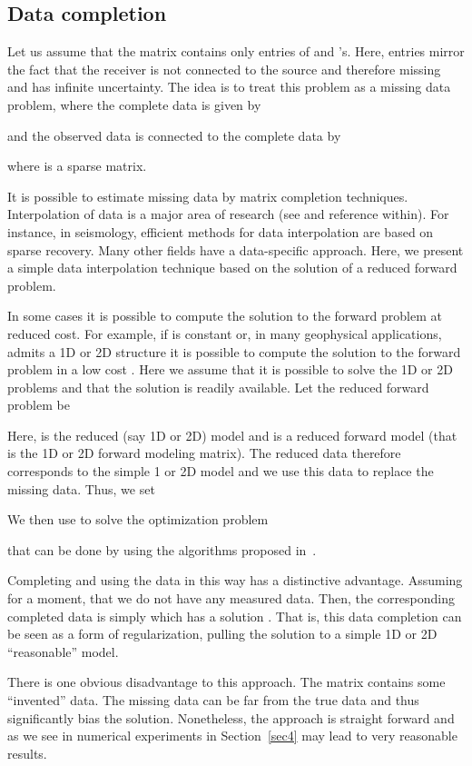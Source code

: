 \documentclass[12pt]{article}
\begin{document}
\subsection{Data completion}
\label{meth1}
Let us assume that the matrix  contains only entries of  and 's. Here, entries  mirror the fact that the  receiver is not connected to the  source and therefore missing and has infinite uncertainty.
The idea is to treat this problem as a missing data problem, where the complete data is given by

and the observed data is connected to the complete data by

where  is a sparse matrix.

It is possible to estimate missing data by matrix completion techniques. Interpolation of data is a major area of research (see \cite{TradUlrychSacchi2001} and reference within). For instance, in seismology, efficient methods for data interpolation are based on sparse recovery. Many other fields have a data-specific approach. Here, we present a simple data interpolation technique based on the solution of a reduced forward problem.

\bigskip

In some cases it is possible to compute the solution to the forward problem at reduced cost.
For example, if  is constant or, in many geophysical applications, admits a 1D or 2D structure
it is possible to compute the solution to the forward problem in a low cost  \cite{wardhow}.
Here we assume that it is possible to solve the 1D or 2D problems and that the solution is readily available. Let the reduced forward problem be

Here,  is the reduced (say 1D or 2D)
model and   is a reduced forward
model (that is the 1D or 2D forward modeling matrix). The reduced data 
therefore corresponds to the simple 1 or 2D model and we use this data to replace
the missing data.
Thus, we set

 We then use   to solve the optimization problem

that can be done by using  the algorithms proposed in~\cite{HaberChungHerrmann2011}.

Completing and using the data in this way has a distinctive advantage. Assuming for a moment, that we do not have any measured data. Then, the corresponding completed data is simply  which has a solution . That is, this data completion can be seen as a form of regularization, pulling the solution to a simple 1D or 2D ``reasonable'' model.

There is one obvious disadvantage to this approach. The matrix  contains some ``invented'' data. The missing data can be far from the true data and thus significantly  bias the solution. Nonetheless, the approach is straight forward and as we see in numerical experiments in Section~\ref{sec4} may lead to very reasonable results.
\end{document}

